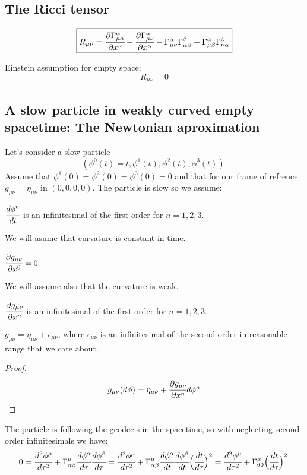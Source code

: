 \documentclass[main.tex]{subfiles}
\begin{document}
\subsection{The Ricci tensor}
$$
\boxed{
R_{\mu\nu} = \cfrac{\partial \Gamma^\alpha_{\mu\alpha}}{\partial x^\nu}
- \cfrac{\partial \Gamma^\alpha_{\mu\nu}}{\partial x^\alpha}
- \Gamma^\alpha_{\mu\nu}\Gamma^\beta_{\alpha\beta}
+ \Gamma^\alpha_{\mu\beta}\Gamma^\beta_{\nu\alpha}
}
$$

Einstein assumption for empty space:
$$
\boxed{R_{\mu\nu} = 0}
$$

\subsection{A slow particle in weakly curved empty spacetime: The Newtonian aproximation}
Let's consider a slow particle
$$(\phi^0(t) = t, \phi^1(t), \phi^2(t), \phi^3(t)).$$ Assume that $\phi^1(0) = \phi^2(0) = \phi^3(0) = 0$ and that for our frame of refrence $g_{\mu\nu} = \eta_{\mu\nu}$ in $(0,0,0,0)$. The particle is slow so we assume:
\begin{assumption}
$\cfrac{d\phi^n}{dt}$ is an infinitesimal of the first order for $n=1,2,3.$
\end{assumption}
We will asume that curvature is constant in time.
\begin{assumption}\label{con_time}
$\cfrac{\partial g_{\mu\nu}}{\partial x^0} = 0$. 
\end{assumption}

We will assume also that the curvature is weak.
\begin{assumption}
$\cfrac{\partial g_{\mu\nu}}{\partial x^n}$ is an infinitesimal of the first order for $n=1,2,3$.
\end{assumption}

\begin{proposition}\label{weak_curv}
$g_{\mu\nu} = \eta_{\mu\nu} + \epsilon_{\mu\nu}$, where $\epsilon_{\mu\nu}$ is an infinitesimal of the second order in reasonable range that we care about. 
\end{proposition}
\begin{proof}
$$
g_{\mu\nu}(d\phi) = \eta_{\mu\nu} + \cfrac{\partial g_{\mu\nu}}{\partial x^n}d\phi^n
$$ 
\end{proof}

The particle is following the geodecis in the spacetime, so with neglecting second-order infinitesimals we have:
$$
0 = \cfrac{d^2\phi^\mu}{d\tau^2} + \Gamma^\mu_{\alpha\beta}\cfrac{d\phi^\alpha}{d\tau}\cfrac{d\phi^\beta}{d\tau} = \cfrac{d^2\phi^\mu}{d\tau^2} + \Gamma^\mu_{\alpha\beta}\cfrac{d\phi^\alpha}{dt}\cfrac{d\phi^\beta}{dt}\Big(\cfrac{dt}{d\tau}\Big)^2 = \cfrac{d^2\phi^\mu}{d\tau^2} + \Gamma^\mu_{00}\Big(\cfrac{dt}{d\tau}\Big)^2.
$$
\end{document}
